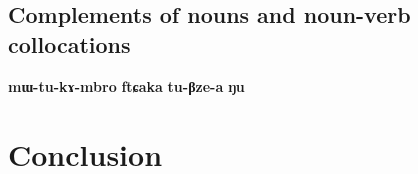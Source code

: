 \documentclass[oldfontcommands,oneside,a4paper,11pt]{article}
\newcommand{\ipa}[1]{\textbf{\phon#1}} %
\newcommand{\jpg}[2]{\ipa{#1} `#2'} %
\begin{document}
% 
%
 

 

\subsection{Complements of nouns and noun-verb collocations}
\ipa{mɯ-tu-kɤ-mbro} 	\ipa{ftɕaka} 	\ipa{tu-βze-a} 	\ipa{ŋu} 

 \section{Conclusion}
 


\end{document}
